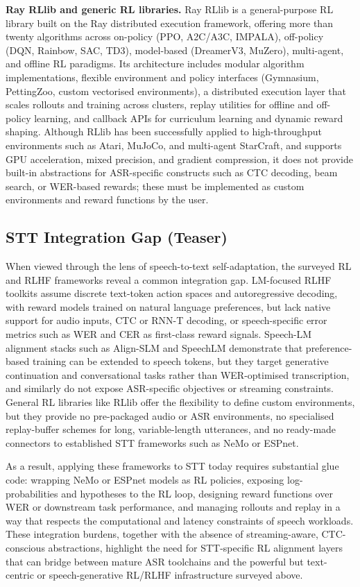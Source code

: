 \documentclass[conference]{IEEEtran}
\begin{document}
\textbf{Ray RLlib and generic RL libraries.}
Ray RLlib is a general-purpose RL library built on the Ray distributed execution framework, offering more than twenty algorithms across on-policy (PPO, A2C/A3C, IMPALA), off-policy (DQN, Rainbow, SAC, TD3), model-based (DreamerV3, MuZero), multi-agent, and offline RL paradigms.
Its architecture includes modular algorithm implementations, flexible environment and policy interfaces (Gymnasium, PettingZoo, custom vectorised environments), a distributed execution layer that scales rollouts and training across clusters, replay utilities for offline and off-policy learning, and callback APIs for curriculum learning and dynamic reward shaping.
Although RLlib has been successfully applied to high-throughput environments such as Atari, MuJoCo, and multi-agent StarCraft, and supports GPU acceleration, mixed precision, and gradient compression, it does not provide built-in abstractions for ASR-specific constructs such as CTC decoding, beam search, or WER-based rewards; these must be implemented as custom environments and reward functions by the user.

\subsection{STT Integration Gap (Teaser)}

When viewed through the lens of speech-to-text self-adaptation, the surveyed RL and RLHF frameworks reveal a common integration gap.
LM-focused RLHF toolkits assume discrete text-token action spaces and autoregressive decoding, with reward models trained on natural language preferences, but lack native support for audio inputs, CTC or RNN-T decoding, or speech-specific error metrics such as WER and CER as first-class reward signals.
Speech-LM alignment stacks such as Align-SLM and SpeechLM demonstrate that preference-based training can be extended to speech tokens, but they target generative continuation and conversational tasks rather than WER-optimised transcription, and similarly do not expose ASR-specific objectives or streaming constraints.
General RL libraries like RLlib offer the flexibility to define custom environments, but they provide no pre-packaged audio or ASR environments, no specialised replay-buffer schemes for long, variable-length utterances, and no ready-made connectors to established STT frameworks such as NeMo or ESPnet.

As a result, applying these frameworks to STT today requires substantial glue code: wrapping NeMo or ESPnet models as RL policies, exposing log-probabilities and hypotheses to the RL loop, designing reward functions over WER or downstream task performance, and managing rollouts and replay in a way that respects the computational and latency constraints of speech workloads.
These integration burdens, together with the absence of streaming-aware, CTC-conscious abstractions, highlight the need for STT-specific RL alignment layers that can bridge between mature ASR toolchains and the powerful but text-centric or speech-generative RL/RLHF infrastructure surveyed above.
\end{document}
